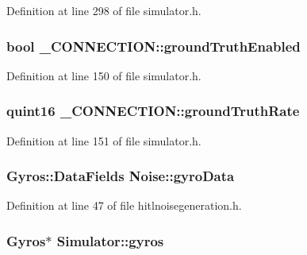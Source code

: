 \-Definition at line 298 of file simulator.\-h.

\hypertarget{group___h_i_t_l_plugin_ga7da92539dd2e9e4aeb94b848dc464b11}{
\subsubsection[{ground\-Truth\-Enabled}]{\setlength{\rightskip}{0pt plus 5cm}bool {\bf \-\_\-\-C\-O\-N\-N\-E\-C\-T\-I\-O\-N\-::ground\-Truth\-Enabled}}}\label{group___h_i_t_l_plugin_ga7da92539dd2e9e4aeb94b848dc464b11}


\-Definition at line 150 of file simulator.\-h.

\hypertarget{group___h_i_t_l_plugin_ga46aa73f7e222771afe3b547bca31eacb}{
\subsubsection[{ground\-Truth\-Rate}]{\setlength{\rightskip}{0pt plus 5cm}quint16 {\bf \-\_\-\-C\-O\-N\-N\-E\-C\-T\-I\-O\-N\-::ground\-Truth\-Rate}}}\label{group___h_i_t_l_plugin_ga46aa73f7e222771afe3b547bca31eacb}


\-Definition at line 151 of file simulator.\-h.

\hypertarget{group___h_i_t_l_plugin_gaf3fae05e7092b987f81f25ff7709ffb9}{
\subsubsection[{gyro\-Data}]{\setlength{\rightskip}{0pt plus 5cm}\-Gyros\-::\-Data\-Fields {\bf \-Noise\-::gyro\-Data}}}\label{group___h_i_t_l_plugin_gaf3fae05e7092b987f81f25ff7709ffb9}


\-Definition at line 47 of file hitlnoisegeneration.\-h.

\hypertarget{group___h_i_t_l_plugin_ga0f9daef3b0fe0731e035f2bff3d9df19}{
\subsubsection[{gyros}]{\setlength{\rightskip}{0pt plus 5cm}\-Gyros$\ast$ {\bf \-Simulator\-::gyros}}}\label{group___h_i_t_l_plugin_ga0f9daef3b0fe0731e035f2bff3d9df19}


